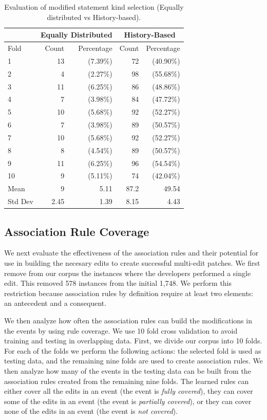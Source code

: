 \documentclass[sigconf]{acmart}
\begin{document}
\begin{table}[]
\centering
\caption{Evaluation of modified statement kind selection (Equally distributed vs History-based).}
\label{10FoldEDvsHB}
\begin{tabular}{l|rr|rr}
\toprule
   &   \multicolumn{2}{c|}{ Equally Distributed}   &   \multicolumn{2}{|c}{ History-Based} \\
\midrule
Fold  &   Count & Percentage  &  Count & Percentage  \\
\midrule
1&13&(7.39\%) & 72&(40.90\%) \\
2&4&(2.27\%) & 98&(55.68\%) \\
3&11&(6.25\%) & 86&(48.86\%) \\
4&7&(3.98\%) & 84&(47.72\%) \\
5&10&(5.68\%) & 92&(52.27\%) \\
6&7&(3.98\%) & 89&(50.57\%) \\
7&10&(5.68\%) & 92&(52.27\%) \\
8&8&(4.54\%) & 89&(50.57\%) \\
9&11&(6.25\%) & 96&(54.54\%) \\
10&9&(5.11\%) & 74&(42.04\%) \\
\bottomrule
Mean &9 & 5.11 & 87.2 & 49.54 \\
\bottomrule
Std Dev & 2.45 & 1.39 & 8.15 & 4.43 \\
\bottomrule

\end{tabular}
\end{table}



\subsection{Association Rule Coverage}

We next evaluate the effectiveness
of the association rules and their potential for use in building the
necesary edits to create successful multi-edit patches. We first
remove from our corpus the instances where the developers
performed a single edit. This removed 578 instances from the initial 1,748.
We perform this restriction because association rules
by definition require at least two elements: an antecedent
and a consequent. 

We then analyze how often the association rules can build the 
modifications in the events by using rule coverage. We use 10 fold cross validation to avoid training and testing in overlapping data.
First, we divide our corpus into 10 folds.
For each of the folds we perform the following actions:
the selected fold is used as testing data, and the
remaining nine folds are used to create association rules.
We then analyze how many of the events in the testing data
can be built from the association 
rules created from the remaining nine folds.
The learned rules can either cover all the edits in an event (the 
event is \emph{fully covered}), they can cover some of the edits in an 
event (the event is \emph{partially covered}), or they can cover none of
the edits in an event (the event is \emph{not covered}).
\end{document}
